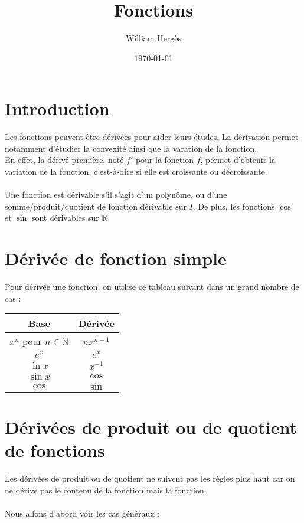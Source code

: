 \documentclass{article}
\title{Fonctions}
\author{William Hergès}
\date{\today}
\begin{document}
	\maketitle

	\section{Introduction}

	Les fonctions peuvent être dérivées pour aider leurs études. La dérivation permet notamment d'étudier la convexité ainsi que la varation de la fonction. \\
	En effet, la dérivé première, noté $f'$ pour la fonction $f$, permet d'obtenir la variation de la fonction, c'est-à-dire si elle est croissante ou décroissante. \\
	\\
	Une fonction est dérivable s'il s'agit d'un polynôme, ou d'une somme/produit/quotient de fonction dérivable sur $I$. De plus, les fonctions $\cos$ et $\sin$ sont dérivables sur $\mathbb{R}$

	\section{Dérivée de fonction simple}
	Pour dérivée une fonction, on utilise ce tableau suivant dans un grand nombre de cas :
	
	\begin{center}
		\begin{tabular}{|c|c|}
	                \hline
		        Base & Dérivée \\
		        \hline
			$x^n$ pour $n \in \mathbb{N}$ & $nx^{n-1}$ \\
		        \hline
			$e^{x}$ & $e^{x}$ \\
		        \hline
			$\ln x$ & $x^{-1}$ \\
			\hline
			$\sin x$ & $\cos$ \\
			\hline
			$\cos$ & $\sin$ \\
			\hline
	        \end{tabular}
	\end{center}

	\section{Dérivées de produit ou de quotient de fonctions}

	Les dérivées de produit ou de quotient ne suivent pas les règles plus haut car on ne dérive pas le contenu de la fonction mais la fonction. \\
	\\
	Nous allons d'abord voir les cas généraux :
\end{document}
